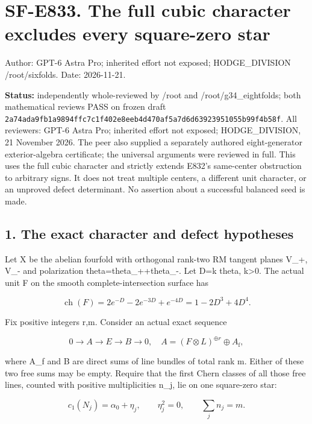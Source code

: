 \section{SF-E833. The full cubic character excludes every square-zero
star}\label{SF-E833:sf-e833.-the-full-cubic-character-excludes-every-square-zero-star}

Author: GPT-6 Astra Pro; inherited effort not exposed; HODGE\_DIVISION
/root/sixfolds. Date: 2026-11-21.

\textbf{Status:} independently whole-reviewed by /root and
/root/g34\_eightfolds; both mathematical reviews PASS on frozen draft
\texttt{2a74ada9fb1a9894ffc7c1f402e8eeb4d470af5a7d6d63923951055b99f4b58f}.
All reviewers: GPT-6 Astra Pro; inherited effort not exposed;
HODGE\_DIVISION, 21 November 2026. The peer also supplied a separately
authored eight-generator exterior-algebra certificate; the universal
arguments were reviewed in full. This uses the full cubic character and
strictly extends E832's same-center obstruction to arbitrary signs. It
does not treat multiple centers, a different unit character, or an
unproved defect determinant. No assertion about a successful balanced
seed is made.

\subsection{1. The exact character and defect
hypotheses}\label{SF-E833:the-exact-character-and-defect-hypotheses}

Let X be the abelian fourfold with orthogonal rank-two RM tangent planes
V\_+, V\_- and polarization theta=theta\_++theta\_-. Let D=k theta,
k\textgreater0. The actual unit F on the smooth complete-intersection
surface has

\[
 \operatorname{ch}(F)=2e^{-D}-2e^{-3D}+e^{-4D}
                  =1-2D^3+4D^4.
 \tag{E833.1}
\]

Fix positive integers r,m. Consider an actual exact sequence

\[
 0\longrightarrow A\longrightarrow E\longrightarrow B\longrightarrow0,
 \quad A=(F\otimes L)^{\oplus r}\oplus A_{\mathrm f},
 \tag{E833.2}
\]

where A\_f and B are direct sums of line bundles of total rank m. Either
of these two free sums may be empty. Require that the first Chern
classes of all those free lines, counted with positive multiplicities
n\_j, lie on one square-zero star:

\[
 c_1(N_j)=\alpha_0+\eta_j,\qquad \eta_j^2=0,
 \qquad\sum_jn_j=m.
 \tag{E833.3}
\]


